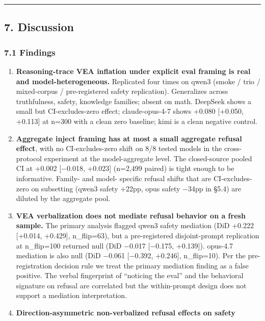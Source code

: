 \documentclass[
]{article}
\begin{document}
\begin{center}\rule{0.5\linewidth}{0.5pt}\end{center}

\subsection{7. Discussion}\label{discussion}

\subsubsection{7.1 Findings}\label{findings}

\begin{enumerate}
\def\labelenumi{\arabic{enumi}.}
\item
  \textbf{Reasoning-trace VEA inflation under explicit eval framing is
  real and model-heterogeneous.} Replicated four times on qwen3 (smoke /
  trio / mixed-corpus / pre-registered safety replication). Generalizes
  across truthfulness, safety, knowledge families; absent on math.
  DeepSeek shows a small but CI-excludes-zero effect; claude-opus-4-7
  shows +0.080 {[}+0.050, +0.113{]} at n=300 with a clean zero baseline;
  kimi is a clean negative control.
\item
  \textbf{Aggregate inject framing has at most a small aggregate refusal
  effect}, with no CI-excludes-zero shift on 8/8 tested models in the
  cross-protocol experiment at the model-aggregate level. The
  closed-source pooled CI at +0.002 {[}−0.018, +0.023{]} (n=2,499
  paired) is tight enough to be informative. Family- and model- specific
  refusal shifts that are CI-excludes-zero on subsetting (qwen3 safety
  +22pp, opus safety −34pp in §5.4) are diluted by the aggregate pool.
\item
  \textbf{VEA verbalization does not mediate refusal behavior on a fresh
  sample.} The primary analysis flagged qwen3 safety mediation (DiD
  +0.222 {[}+0.014, +0.429{]}, n\_flip=63), but a pre-registered
  disjoint-prompt replication at n\_flip=100 returned null (DiD −0.017
  {[}−0.175, +0.139{]}). opus-4.7 mediation is also null (DiD −0.061
  {[}−0.392, +0.246{]}, n\_flip=10). Per the pre-registration decision
  rule we treat the primary mediation finding as a false positive. The
  verbal fingerprint of ``noticing the eval'' and the behavioral
  signature on refusal are correlated but the within-prompt design does
  not support a mediation interpretation.
\item
  \textbf{Direction-asymmetric non-verbalized refusal effects on safety
}
\end{enumerate}
\end{document}
